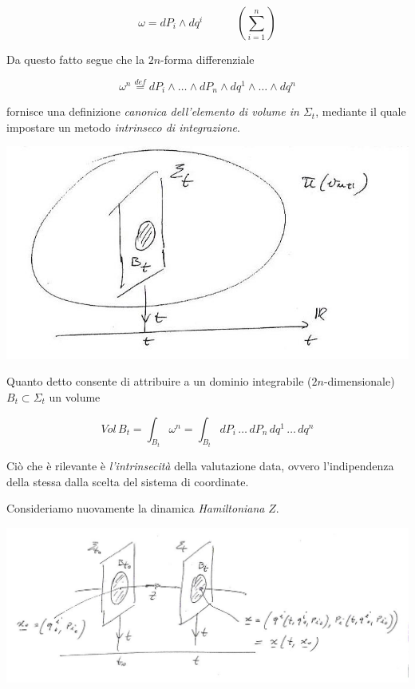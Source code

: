 \begin{equation*}
\omega = dP_i \wedge dq^i \quad \qquad \left( \sum_{i=1}^n \right) 
\end{equation*}

Da questo fatto segue che la $ 2n $-forma differenziale 

\begin{equation*}
\omega^n \stackrel{def}{=} dP_i \wedge \dots \wedge dP_n \wedge dq^1 \wedge \dots \wedge dq^n
\end{equation*}

fornisce una definizione \textit{canonica dell'elemento di volume in $ \Sigma_t $}, mediante il quale impostare un metodo \textit{intrinseco di integrazione}.

\begin{center}
\includegraphics[width=0.5\columnwidth]{media/teorema-di-liuville-sulla-preservazione-del-volume-nello-spazio-delle-fasi-da-parte-della-dinamica-hamiltoniana/34-2.jpg}
\end{center}

Quanto detto consente di attribuire a un dominio integrabile ($ 2n $-dimensionale) $ B_t \subset \Sigma_t $ un volume

\begin{equation*}
Vol \, B_t = \int_{B_t} \omega^n = \int_{B_t} dP_i \, \dots \, dP_n \, dq^1 \, \dots \, dq^n
\end{equation*}

Ciò che è rilevante è \textit{l'intrinsecità} della valutazione data, ovvero l'indipendenza della stessa dalla scelta del sistema di coordinate.


Consideriamo nuovamente la dinamica \textit{Hamiltoniana} $ Z $.

\begin{center}
\includegraphics[width=0.95\columnwidth]{media/teorema-di-liuville-sulla-preservazione-del-volume-nello-spazio-delle-fasi-da-parte-della-dinamica-hamiltoniana/35-1.jpg}
\end{center}


